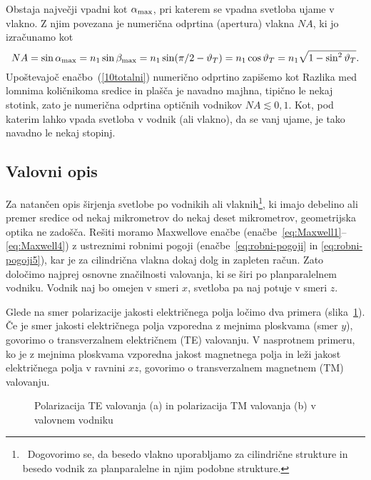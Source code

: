 Obstaja največji vpadni kot $\alpha_{\rm max}$, pri katerem se
vpadna svetloba ujame v vlakno.
Z njim povezana je numerična odprtina (apertura) vlakna $NA$, 
ki jo izračunamo kot 
\begin{equation}
NA = \sin \alpha_{\rm max} = n_1 \sin \beta_{\rm max} = 
n_1 \sin(\pi/2-\vartheta_T) =
n_1 \cos\vartheta_T = n_1 \sqrt{1-\sin^2\vartheta_T}.
\label{10NAa}
\end{equation}
Upoštevajoč enačbo~(\ref{10totalni}) numerično odprtino zapišemo kot 
Razlika med lomnima količnikoma sredice in plašča je navadno majhna,
tipično le nekaj stotink, zato je numerična odprtina optičnih 
vodnikov $NA \lesssim 0,1 $. Kot, pod katerim lahko vpada svetloba
v vodnik (ali vlakno), da se vanj ujame, je tako navadno le nekaj stopinj.

\subsection*{Valovni opis}
Za natančen opis širjenja svetlobe po vodnikih ali vlaknih\footnote{~Dogovorimo se, da  
besedo vlakno uporabljamo za cilindrične strukture in besedo vodnik za planparalelne 
in njim podobne strukture.}, ki imajo debelino ali premer
sredice od nekaj mikrometrov do nekaj deset mikrometrov, geometrijska optika ne
zadošča. Rešiti moramo Maxwellove enačbe (enačbe~\ref{eq:Maxwell1}--\ref{eq:Maxwell4}) 
z ustreznimi robnimi pogoji (enačbe~\ref{eq:robni-pogoji} in \ref{eq:robni-pogoji5}),
kar je za cilindrična vlakna dokaj dolg in zapleten račun. Zato določimo najprej 
osnovne značilnosti valovanja, ki se širi po planparalelnem vodniku. Vodnik naj bo omejen 
v smeri $x$, svetloba pa naj potuje v smeri $z$.

Glede na smer polarizacije jakosti električnega polja
ločimo dva primera (slika~\ref{fig:TETM}). Če je smer jakosti električnega polja
vzporedna z mejnima ploskvama (smer $y$), 
govorimo o transverzalnem električnem (TE) valovanju. 
V nasprotnem primeru, ko je 
z mejnima ploskvama vzporedna jakost magnetnega polja in 
leži jakost električnega polja v ravnini $xz$, 
govorimo o transverzalnem magnetnem (TM) valovanju.
\begin{figure}[ht]
\centering
\def\svgwidth{140truemm} 

\caption{Polarizacija TE valovanja (a) in polarizacija TM valovanja (b) v valovnem vodniku}
\label{fig:TETM}
\end{figure}

